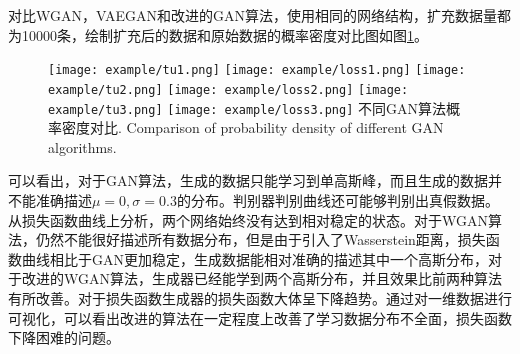对比WGAN，VAEGAN和改进的GAN算法，使用相同的网络结构，扩充数据量都为10000条，绘制扩充后的数据和原始数据的概率密度对比图如图\ref{fig:shiyan}。


\begin{figure}[htpb]
	\centering
	{\texttt{[image: example/tu1.png]}}
	\hspace{0.5em}
	{\texttt{[image: example/loss1.png]}}
	\newline
	\centering
	{\texttt{[image: example/tu2.png]}}
	\hspace{0.5em}
	{\texttt{[image: example/loss2.png]}}
	\newline
	\centering
	{\texttt{[image: example/tu3.png]}}
	\hspace{0.5em}
	{\texttt{[image: example/loss3.png]}}
	\bicaption
	{不同GAN算法概率密度对比.}
	{Comparison of probability density of different GAN algorithms.}
	\label{fig:shiyan}
\end{figure}



可以看出，对于GAN算法，生成的数据只能学习到单高斯峰，而且生成的数据并不能准确描述$\mu=0,\sigma=0.3$的分布。判别器判别曲线还可能够判别出真假数据。从损失函数曲线上分析，两个网络始终没有达到相对稳定的状态。对于WGAN算法，仍然不能很好描述所有数据分布，但是由于引入了Wasserstein距离，损失函数曲线相比于GAN更加稳定，生成数据能相对准确的描述其中一个高斯分布，对于改进的WGAN算法，生成器已经能学到两个高斯分布，并且效果比前两种算法有所改善。对于损失函数生成器的损失函数大体呈下降趋势。通过对一维数据进行可视化，可以看出改进的算法在一定程度上改善了学习数据分布不全面，损失函数下降困难的问题。
